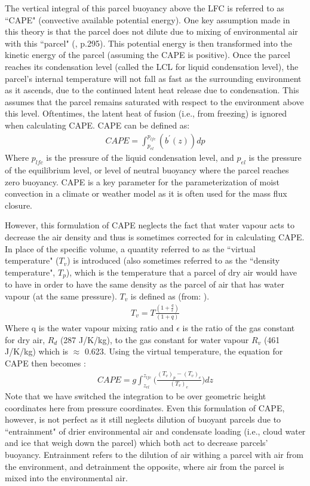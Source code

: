 \documentclass[letterpaper,12pt,titlepage,oneside,final]{book}
\begin{document}
The vertical integral of this parcel buoyancy above the LFC is referred to as ``CAPE" (convective available potential energy). One key assumption made in this theory is that the parcel does not dilute due to mixing of environmental air with this ``parcel" (\citep{holton_introduction_2004}, p.295). This potential energy is then transformed into the kinetic energy of the parcel (assuming the CAPE is positive). Once the parcel reaches its condensation level (called the LCL for liquid condensation level), the parcel's internal temperature will not fall as fast as the surrounding environment as it ascends, due to the continued latent heat release due to condensation. This assumes that the parcel remains saturated with respect to the environment above this level. Oftentimes, the latent heat of fusion (i.e., from freezing) is ignored when calculating CAPE. CAPE can be defined as: 
\begin{align}
CAPE=\int_{p_{el}}^{p_{lfc}}(b^{'}(z)){dp}
\end{align}
Where $p_{lfc}$ is the pressure of the liquid condensation level, and $p_{el}$ is the pressure of the equilibrium level, or level of neutral buoyancy where the parcel reaches zero buoyancy. CAPE is a key parameter for the parameterization of moist convection in a climate or weather model as it is often used for the mass flux closure. 

However, this formulation of CAPE neglects the fact that water vapour acts to decrease the air density and thus is sometimes corrected for in calculating CAPE. In place of the specific volume, a quantity referred to as the ``virtual temperature" ($T_{v}$) is introduced (also sometimes referred to as the ``density temperature", $T_{p}$), which is the temperature that a parcel of dry air would have to have in order to have the same density as the parcel of air that has water vapour (at the same pressure). $T_{v}$ is defined as (from: \citep{AMS_virtual_2012}).
\begin{align}
T_{v}=T\frac{(1+\frac{q}{\epsilon})}{(1+q)}
\end{align}
Where q is the water vapour mixing ratio and $\epsilon$ is the ratio of the gas constant for dry air, $R_{d}$ (287 J/K/kg), to the gas constant for water vapour $R_{v}$ (461 J/K/kg) which is $\approx$ 0.623. Using the virtual temperature, the equation for CAPE then becomes \citep{doswell_effect_1994}:
\begin{align}\label{eq:CAPE}
CAPE=g\int_{z_{el}}^{z_{lfc}}\Big(\frac{(T_{v})_{p}-(T_{v})_{e}}{(T_{v})_{e}}\Big){dz}
\end{align}
Note that we have switched the integration to be over geometric height coordinates here from pressure coordinates. Even this formulation of CAPE, however, is not perfect as it still neglects dilution of buoyant parcels due to ``entrainment" of drier environmental air and condensate loading (i.e., cloud water and ice that weigh down the parcel) which both act to decrease parcels' buoyancy. Entrainment refers to the dilution of air withing a parcel with air from the environment, and detrainment the opposite, where air from the parcel is mixed into the environmental air.
\end{document}
